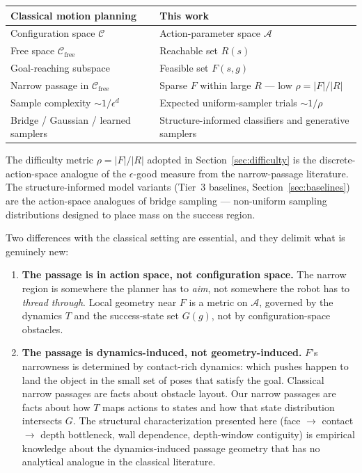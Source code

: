 \documentclass[11pt]{article}
\begin{document}
\begin{center}
\renewcommand{\arraystretch}{1.15}
\begin{tabular}{ll}
\toprule
Classical motion planning & This work \\
\midrule
Configuration space $\mathcal{C}$ & Action-parameter space $\mathcal{A}$ \\
Free space $\mathcal{C}_{\text{free}}$ & Reachable set $R(s)$ \\
Goal-reaching subspace & Feasible set $F(s, g)$ \\
Narrow passage in $\mathcal{C}_{\text{free}}$ & Sparse $F$ within large $R$ --- low $\rho = |F|/|R|$ \\
Sample complexity $\sim 1/\epsilon^d$ & Expected uniform-sampler trials $\sim 1/\rho$ \\
Bridge / Gaussian / learned samplers & Structure-informed classifiers and generative samplers \\
\bottomrule
\end{tabular}
\end{center}

The difficulty metric $\rho = |F|/|R|$ adopted in
Section~\ref{sec:difficulty} is the discrete-action-space analogue of the
$\epsilon$-good measure from the narrow-passage literature. The
structure-informed model variants (Tier~3 baselines,
Section~\ref{sec:baselines}) are the action-space analogues of bridge
sampling --- non-uniform sampling distributions designed to place mass on the
success region.

Two differences with the classical setting are essential, and they delimit
what is genuinely new:
\begin{enumerate}[leftmargin=2em,itemsep=2pt]
  \item \textbf{The passage is in action space, not configuration space.} The
        narrow region is somewhere the planner has to \emph{aim}, not
        somewhere the robot has to \emph{thread through}. Local geometry near
        $F$ is a metric on $\mathcal{A}$, governed by the dynamics $T$ and
        the success-state set $G(g)$, not by configuration-space obstacles.
  \item \textbf{The passage is dynamics-induced, not geometry-induced.} $F$'s
        narrowness is determined by contact-rich dynamics: which pushes
        happen to land the object in the small set of poses that satisfy the
        goal. Classical narrow passages are facts about obstacle layout. Our
        narrow passages are facts about how $T$ maps actions to states and
        how that state distribution intersects $G$. The structural
        characterization presented here (face $\to$ contact $\to$ depth
        bottleneck, wall dependence, depth-window contiguity) is empirical
        knowledge about the dynamics-induced passage geometry that has no
        analytical analogue in the classical literature.
\end{enumerate}
\end{document}
